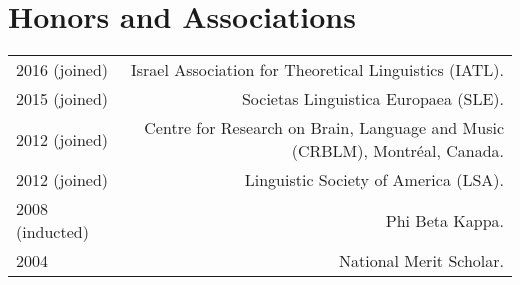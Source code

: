 \documentclass[12pt,letterpaper,twoside]{article}
\makeatletter
\newenvironment{cvsection}{%
  \begin{longtable}[l]{@{}L@{} @{}R@{}}
}{%
  \end{longtable}
}
\makeatother
\begin{document}
\section*{Honors and Associations}

\begin{cvsection}
  2016 {\footnotesize (joined)} & Israel Association for Theoretical Linguistics (IATL).\\
  2015 {\footnotesize (joined)} & Societas Linguistica Europaea (SLE).\\
  2012 {\footnotesize (joined)} & Centre for Research on Brain, Language and Music (CRBLM), Montr\'{e}al, Canada.\\
  2012 {\footnotesize (joined)} & Linguistic Society of America (LSA).\\
  2008 {\footnotesize (inducted)} & Phi Beta Kappa.\\
  2004 & National Merit Scholar.\\
\end{cvsection}
\end{document}
